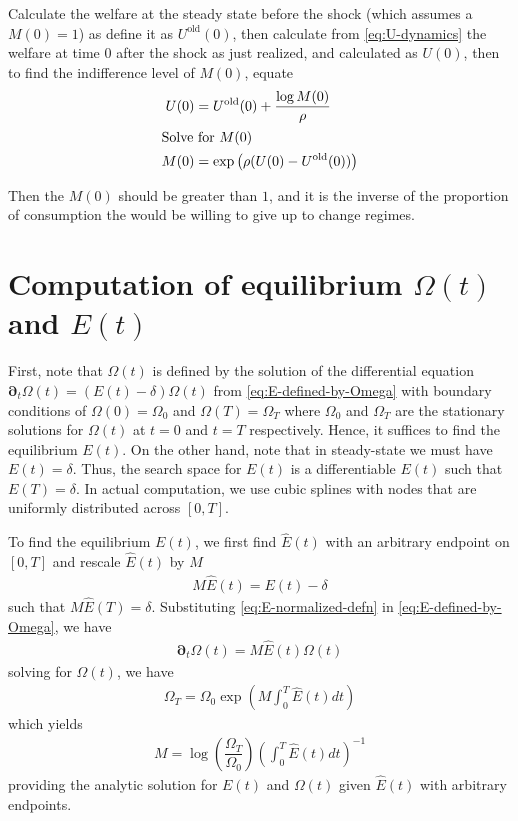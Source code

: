 \documentclass[11pt]{article}
\newcommand{\D}[1][]{\ensuremath{\boldsymbol{\partial}_{#1}}}
\begin{document}
Calculate the welfare at the steady state before the shock (which assumes a $M(0) = 1$) as define it as $U^{\text{old}}(0)$, then calculate from \cref{eq:U-dynamics} the welfare at time $0$ after the shock as just realized, and calculated as $U(0)$, then to find the indifference level of $M(0)$, equate
\begin{align}
	U(0) &= U^{\text{old}}(0)  + \frac{\log M(0)}{\rho}\\
	\intertext{Solve for $M(0)$}
	M(0) &= \exp \left(\rho(U(0) - U^{\text{old}}(0))\right)
\end{align}

Then the $M(0)$ should be greater than $1$, and it is the inverse of the proportion of consumption the would be willing to give up to change regimes.




\section{Computation of equilibrium $\Omega(t)$ and $E(t)$}
First, note that $\Omega(t)$ is defined by the solution of the differential equation $	\D[t] \Omega(t) = \left(E(t) - \delta \right)\Omega(t)$ from \cref{eq:E-defined-by-Omega} with boundary conditions of $\Omega(0) = \Omega_0$ and $\Omega(T) = \Omega_T$ where $\Omega_0$ and $\Omega_T$ are the stationary solutions for $\Omega(t)$ at $t = 0$ and $t = T$ respectively. Hence, it suffices to find the equilibrium $E(t)$. On the other hand, note that in steady-state we must have $E(t) = \delta$. Thus, the search space for $E(t)$ is a differentiable $E(t)$ such that $E(T) = \delta$. In actual computation, we use cubic splines with nodes that are uniformly distributed across $[0,T]$.

To find the equilibrium $E(t)$, we first find $\widehat E(t)$ with an arbitrary endpoint on $[0,T]$ and rescale $\widehat E(t)$ by $M$
\begin{align}\label{eq:E-normalized-defn}
	M \widehat E(t) = E(t) - \delta
\end{align}
such that $M \widehat E(T) = \delta$. Substituting \cref{eq:E-normalized-defn} in \cref{eq:E-defined-by-Omega}, we have
\begin{align}
\D[t] \Omega(t) = M \widehat{E}(t) \Omega(t)
\end{align}
solving for $\Omega(t)$, we have
\begin{align}
\Omega_T = \Omega_0 \exp \left(M \int_0^T \widehat{E}(t) dt\right)
\end{align}
which yields
\begin{align}
M = \log \left(\dfrac{\Omega_T}{\Omega_0}\right)\left(\int_0^T \widehat E(t) dt \right)^{-1}
\end{align}
providing the analytic solution for $E(t)$ and $\Omega(t)$ given $\widehat{E} (t)$ with arbitrary endpoints.
\end{document}
